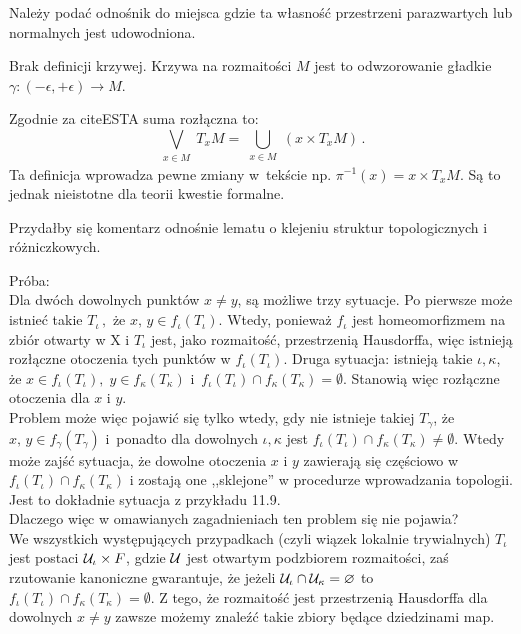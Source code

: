 \documentclass[a4paper,11pt]{article}
\begin{document}
\vspace{\spaceFour}


\start {} Należy podać odnośnik do miejsca gdzie ta własność
przestrzeni parazwartych lub normalnych jest udowodniona.

\vspace{\spaceFour}


\start {} Brak definicji krzywej. Krzywa na rozmaitości $M$ jest
to odwzorowanie gładkie $\gamma : ( - \epsilon, + \epsilon ) \to M$.

\start {} Zgodnie za cite{ESTA} suma rozłączna to:
\begin{equation*}
  \bigvee_{ \substack{ x \in M } } T_{ x } M
  = \bigcup_{ \substack{ x \in M } }( x \times T_{ x } M ) \, .
\end{equation*}
Ta definicja wprowadza pewne zmiany w~tekście np.
$\pi^{ -1 }( x ) = x \times T_{ x }M$. Są to jednak nieistotne dla
teorii kwestie formalne.

\vspace{\spaceFour}


\start {} Przydałby się komentarz odnośnie lematu o klejeniu
struktur topologicznych i różniczkowych.

Próba: \\
Dla dwóch dowolnych punktów $x \neq y$, są możliwe trzy sytuacje. Po
pierwsze może istnieć takie $T_{ \iota } \, ,$ że
$x, \, y \in f_{ \iota }( T_{ \iota } )$. Wtedy, ponieważ
$f_{ \iota }$ jest homeomorfizmem na zbiór otwarty w X i $T_{ \iota }$
jest, jako rozmaitość, przestrzenią Hausdorffa, więc istnieją
rozłączne otoczenia tych punktów w $f_{ \iota } ( T_{ \iota } )$.
Druga sytuacja: istnieją takie $\iota, \kappa$, że
$x \in f_{ \iota } ( T_{ \iota } ), \; y \in f_{ \kappa } ( T_{ \kappa
} )$
i~$f_{ \iota } ( T_{ \iota } ) \cap f_{ \kappa } ( T_{ \kappa } ) =
\emptyset$.
Stanowią więc rozłączne otoczenia dla $x$ i $y$. \\
Problem może więc pojawić się tylko wtedy, gdy nie istnieje takiej
$T_{ \gamma }$, że $x, \, y \in f_{ \gamma }( T_{ \gamma } )$
i~ponadto dla dowolnych $\iota, \kappa$ jest
$f_{ \iota } ( T_{ \iota } ) \cap f_{ \kappa } ( T_{ \kappa } ) \neq
\emptyset$. Wtedy może zajść sytuacja, że dowolne otoczenia $x$ i $y$
zawierają się częściowo w
$f_{ \iota } ( T_{ \iota } ) \cap f_{ \kappa } ( T_{ \kappa } )$ i
zostają one ,,sklejone'' w procedurze wprowadzania topologii. Jest to
dokładnie sytuacja z
przykładu 11.9.\\
Dlaczego więc w omawianych zagadnieniach ten problem się nie
pojawia?\\ We wszystkich występujących przypadkach (czyli wiązek
lokalnie trywialnych) $T_{ \iota }$ jest postaci
$\mathcal{ U }_{ \iota } \times F$, gdzie $\mathcal{ U }$ jest otwartym podzbiorem
rozmaitości, zaś rzutowanie kanoniczne gwarantuje, że jeżeli
$\mathcal{ U }_{ \iota } \cap \mathcal{ U }_{ \kappa } = \varnothing$ to
$f_{ \iota } (T_{ \iota }) \cap f_{ \kappa }(T_{ \kappa }) =
\emptyset$. Z tego, że rozmaitość jest przestrzenią Hausdorffa dla
dowolnych $x \neq y$ zawsze możemy znaleźć takie zbiory będące
dziedzinami map.
\end{document}
